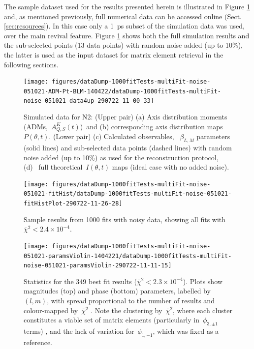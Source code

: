\documentclass[10pt]{article}
\begin{document}
The sample dataset used for the results presented herein is illustrated in Figure \ref{720080} and, as mentioned previously, full numerical data can be accessed online (Sect. \ref{sec:resources}). In this case only a 1~ps subset of the simulation data was used, over the main revival feature. Figure \ref{720080} shows both the full simulation results and the sub-selected points (13 data points) with random noise added (up to 10\%), the latter is used as the input dataset for matrix element retrieval in the following sections. %
\begin{figure}[H]
\begin{center}
\texttt{[image: figures/dataDump-1000fitTests-multiFit-noise-051021-ADM-Pt-BLM-140422/dataDump-1000fitTests-multiFit-noise-051021-data4up-290722-11-00-33]}
\caption{{Simulated data for N2: (Upper pair) (a) Axis distribution moments
(ADMs,~\(A^{K}_{Q,S}(t)\))~and (b) corresponding axis distribution
maps~\(P(\theta, t)\). (Lower pair) (c) Calculated observables,
~\(\beta_{L,M}\) parameters (solid lines) and sub-selected data
points (dashed lines) with random noise added (up to 10\%) as used for
the reconstruction protocol, (d)~ full theoretical~\(I(\theta,t)\)
maps (ideal case with no added noise).
{\label{720080}}%
}}
\end{center}
\end{figure}
\begin{figure}[H]
\begin{center}
\texttt{[image: figures/dataDump-1000fitTests-multiFit-noise-051021-fitHist/dataDump-1000fitTests-multiFit-noise-051021-fitHistPlot-290722-11-26-28]}
\caption{{Sample results from 1000 fits with noisy data, showing all fits with
\(\bar{\chi}^2 < 2.4\times10^{-4}\).
{\label{509194}}%
}}
\end{center}
\end{figure}
\begin{figure}[H]
\begin{center}
\texttt{[image: figures/dataDump-1000fitTests-multiFit-noise-051021-paramsViolin-1404221/dataDump-1000fitTests-multiFit-noise-051021-paramsViolin-290722-11-11-15]}
\caption{{Statistics for the 349 best fit results (\(\bar{\chi}^2 < 2.3 \times 10^{-4}\)). Plots show
magnitudes (top) and phase (bottom) parameters, labelled
by~\((l,m)\), with spread proportional to the number of results
and colour-mapped by~\(\bar{\chi}^2\) . Note the clustering
by~\(\bar{\chi}^2\), where each cluster constitutes a viable set of
matrix elements (particularly in~\(\phi_{3,\pm1}\) terms) , and the
lack of variation for~\(\phi_{1,-1}\), which was fixed as a
reference.
{\label{494229}}%
}}
\end{center}
\end{figure}
\end{document}

